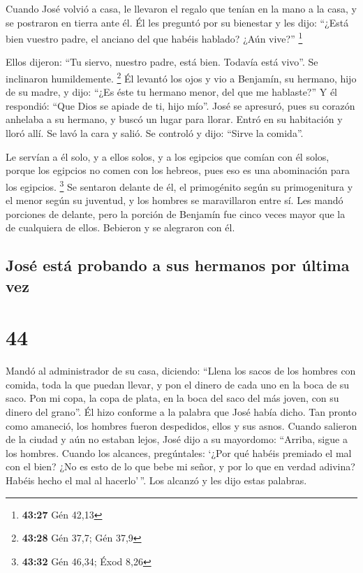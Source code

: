  Cuando José volvió a casa, le llevaron el regalo que
tenían en la mano a la casa, y se postraron en tierra ante él.
 Él les preguntó por su bienestar y les dijo: ``¿Está
bien vuestro padre, el anciano del que habéis hablado? ¿Aún vive?''
\footnote{\textbf{43:27} Gén 42,13}

 Ellos dijeron: ``Tu siervo, nuestro padre, está bien.
Todavía está vivo''. Se inclinaron humildemente. \footnote{\textbf{43:28}
  Gén 37,7; Gén 37,9}  Él levantó los ojos y vio a
Benjamín, su hermano, hijo de su madre, y dijo: ``¿Es éste tu hermano
menor, del que me hablaste?'' Y él respondió: ``Que Dios se apiade de
ti, hijo mío''.  José se apresuró, pues su corazón
anhelaba a su hermano, y buscó un lugar para llorar. Entró en su
habitación y lloró allí.  Se lavó la cara y salió. Se
controló y dijo: ``Sirve la comida''.

 Le servían a él solo, y a ellos solos, y a los egipcios
que comían con él solos, porque los egipcios no comen con los hebreos,
pues eso es una abominación para los egipcios. \footnote{\textbf{43:32}
  Gén 46,34; Éxod 8,26}  Se sentaron delante de él, el
primogénito según su primogenitura y el menor según su juventud, y los
hombres se maravillaron entre sí.  Les mandó porciones de
delante, pero la porción de Benjamín fue cinco veces mayor que la de
cualquiera de ellos. Bebieron y se alegraron con él.

\hypertarget{josuxe9-estuxe1-probando-a-sus-hermanos-por-uxfaltima-vez}{%
\subsection{José está probando a sus hermanos por última
vez}\label{josuxe9-estuxe1-probando-a-sus-hermanos-por-uxfaltima-vez}}

\hypertarget{section-43}{%
\section{44}\label{section-43}}

 Mandó al administrador de su casa, diciendo: ``Llena los
sacos de los hombres con comida, toda la que puedan llevar, y pon el
dinero de cada uno en la boca de su saco.  Pon mi copa, la
copa de plata, en la boca del saco del más joven, con su dinero del
grano''. Él hizo conforme a la palabra que José había dicho.
 Tan pronto como amaneció, los hombres fueron despedidos,
ellos y sus asnos.  Cuando salieron de la ciudad y aún no
estaban lejos, José dijo a su mayordomo: ``Arriba, sigue a los hombres.
Cuando los alcances, pregúntales: `¿Por qué habéis premiado el mal con
el bien?  ¿No es esto de lo que bebe mi señor, y por lo
que en verdad adivina? Habéis hecho el mal al hacerlo'\,''.
 Los alcanzó y les dijo estas palabras.

